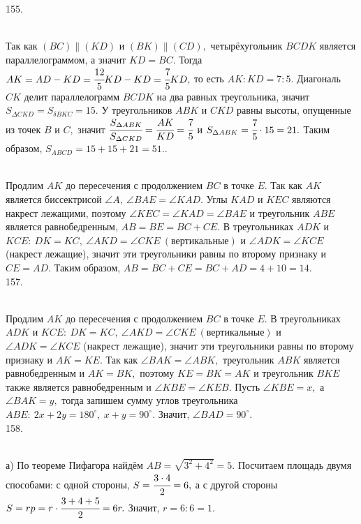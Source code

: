 155. \begin{figure}[ht!]
\end{figure}\\
Так как $(BC)\parallel (KD)$ и $(BK)\parallel(CD),$ четырёхугольник $BCDK$ является параллелограммом, а значит $KD=BC.$ Тогда $AK=AD-KD=\cfrac{12}{5}KD-KD=\cfrac{7}{5}KD,$ то есть $AK:KD=7:5.$ Диагональ $CK$ делит параллелограмм $BCDK$ на два равных треугольника, значит $S_{\Delta CKD}=S_{\delta BKC}=15.$ У треугольников $ABK$ и $CKD$ равны высоты, опущенные из точек $B$ и $C,$ значит $\cfrac{S_{\Delta ABK}}{S_{\Delta CKD}}=\cfrac{AK}{KD}=\cfrac{7}{5}$ и $S_{\Delta ABK}=\cfrac{7}{5}\cdot15=21.$ Таким образом, $S_{ABCD}=15+15+21=51.$\newpage{}. \begin{figure}[ht!]
\end{figure}\\
Продлим $AK$ до пересечения с продолжением $BC$ в точке $E.$ Так как $AK$ является биссектрисой $\angle A,\ \angle BAE=\angle KAD.$ Углы $KAD$ и $KEC$ являются накрест лежащими, поэтому $\angle KEC=\angle KAD=\angle BAE$ и треугольник $ABE$ является равнобедренным, $AB=BE=BC+CE.$ В треугольниках $ADK$ и $KCE:\ DK=KC,\ \angle AKD=\angle CKE\ (\text{вертикальные})$ и $\angle ADK=\angle KCE$ (накрест лежащие), значит эти треугольники равны по второму признаку и $CE=AD.$ Таким образом, $AB=BC+CE=BC+AD=4+10=14.$\\
157. \begin{figure}[ht!]
\end{figure}\\
Продлим $AK$ до пересечения с продолжением $BC$ в точке $E.$  В треугольниках $ADK$ и $KCE:\ DK=KC,\ \angle AKD=\angle CKE\ (\text{вертикальные})$ и $\angle ADK=\angle KCE$ (накрест лежащие), значит эти треугольники равны по второму признаку и $AK=KE.$ Так как $\angle BAK=\angle ABK,$ треугольник $ABK$ является равнобедренным и $AK=BK,$ поэтому $KE=BK=AK$ и треугольник $BKE$ также является равнобедренным и  $\angle KBE=\angle KEB.$ Пусть $\angle KBE=x,$ а $\angle BAK=y,$ тогда запишем сумму углов треугольника $ABE:\ 2x+2y=180^\circ,\ x+y=90^\circ.$ Значит, $\angle BAD=90^\circ.$\\
158. \begin{figure}[ht!]
\end{figure}\\
а) По теореме Пифагора найдём $AB=\sqrt{3^2+4^2}=5.$ Посчитаем площадь двумя способами: с одной стороны, $S=\cfrac{3\cdot4}{2}=6,$ а с другой стороны $S=rp=r\cdot\cfrac{3+4+5}{2}=6r.$ Значит, $r=6:6=1.$\\
